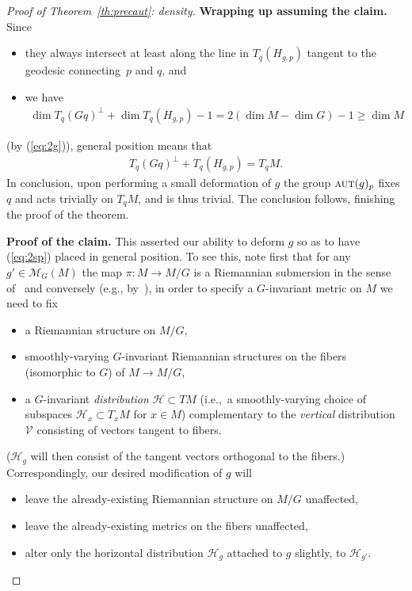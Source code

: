 \documentclass[10pt,a4paper]{amsart}
\numberwithin{equation}{section}
\newcommand{\cat}[1]{\textsc{#1}}
\begin{document}
\begin{proof}[Proof of Theorem~\ref{th:precaut}: density]
 {\bf Wrapping up assuming the claim.} Since
 \begin{itemize}\itemsep=0pt
 \item they always intersect at least along the line in $T_q(H_{g,p})$ tangent to the geodesic connecting~$p$ and $q$, and
 \item we have
 \begin{gather*}
 \dim T_q(Gq)^{\perp} + \dim T_q(H_{g,p}) -1 = 2(\dim M-\dim G)-1\ge \dim M
 \end{gather*}
 \end{itemize}
 (by (\ref{eq:2g})), general position means that
 \begin{gather*}
 T_q(Gq)^{\perp} + T_q(H_{g,p}) = T_qM.
 \end{gather*}
 In conclusion, upon performing a small deformation of $g$ the group $\cat{aut}(g)_p$ fixes $q$ and acts trivially on $T_qM$, and is thus trivial. The conclusion follows, finishing the proof of the theorem.

 {\bf Proof of the claim.} This asserted our ability to deform $g$ so as to have (\ref{eq:2sp}) placed in general position. To see this, note first that for any $g'\in \mathcal{M}_G(M)$ the map $\pi\colon M\to M/G$ is a Riemannian submersion in the sense of~\cite[Definition~9.8]{bes} and conversely (e.g., by~\cite[Section~9.15]{bes}), in order to specify a $G$-invariant metric on $M$ we need to fix
 \begin{itemize}\itemsep=0pt
 \item a Riemannian structure on $M/G$,
 \item smoothly-varying $G$-invariant Riemannian structures on the fibers (isomorphic to $G$) of $M\to M/G$,
 \item a $G$-invariant {\it distribution} $\mathcal{H}\subset TM$ (i.e.,~a smoothly-varying choice of subspaces $\mathcal{H}_x\subset T_xM$ for $x\in M$) complementary to the {\it vertical} distribution $\mathcal{V}$ consisting of vectors tangent to fibers.
 \end{itemize}
 ($\mathcal{H}_g$ will then consist of the tangent vectors orthogonal to the fibers.) Correspondingly, our desired modification of $g$ will
 \begin{itemize}\itemsep=0pt
 \item leave the already-existing Riemannian structure on $M/G$ unaffected,
 \item leave the already-existing metrics on the fibers unaffected,
 \item alter only the horizontal distribution $\mathcal{H}_g$ attached to $g$ slightly, to $\mathcal{H}_{g'}$.
 \end{itemize}


\end{proof}
\end{document}
